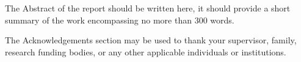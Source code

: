 \beforeabstract
{}
The Abstract of the report should be written here, it should provide a short summary of the work encompassing no more than 300 words.

The Acknowledgements section may be used to thank your supervisor, family, research funding bodies, or any other applicable individuals or institutions.

\afterpreface \afterabstract
